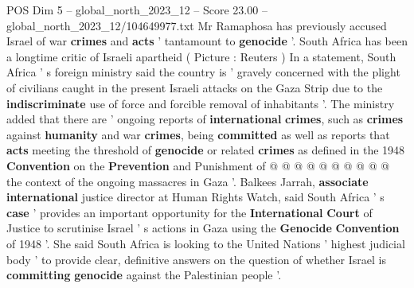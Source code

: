 \begin{textsample}{POS Dim 5 – global\_north\_2023\_12 – Score 23.00 – global\_north\_2023\_12/104649977.txt}
Mr Ramaphosa has previously accused Israel of war \textbf{crimes} and \textbf{acts} ' tantamount to \textbf{genocide} '.
South Africa has been a longtime critic of Israeli apartheid ( Picture : Reuters ) In a statement, South Africa ' s foreign ministry said the country is ' gravely concerned with the plight of civilians caught in the present Israeli attacks on the Gaza Strip due to the \textbf{indiscriminate} use of force and forcible removal of inhabitants '.
The ministry added that there are ' ongoing reports of \textbf{international} \textbf{crimes}, such as \textbf{crimes} against \textbf{humanity} and war \textbf{crimes}, being \textbf{committed} as well as reports that \textbf{acts} meeting the threshold of \textbf{genocide} or related \textbf{crimes} as defined in the 1948 \textbf{Convention} on the \textbf{Prevention} and Punishment of @ @ @ @ @ @ @ @ @ @ the context of the ongoing massacres in Gaza '.
Balkees Jarrah, \textbf{associate} \textbf{international} justice director at Human Rights Watch, said South Africa ' s \textbf{case} ' provides an important opportunity for the \textbf{International} \textbf{Court} of Justice to scrutinise Israel ' s actions in Gaza using the \textbf{Genocide} \textbf{Convention} of 1948 '.
She said South Africa is looking to the United Nations ' highest judicial body ' to provide clear, definitive answers on the question of whether Israel is \textbf{committing} \textbf{genocide} against the Palestinian people '.

\end{textsample}
